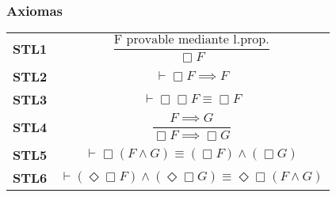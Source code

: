 \subsubsection{Axiomas}
\begin{tabular}{ll}
    \textbf{STL1} & 
    \begin{minipage}{0.5\linewidth}
    \begin{equation*}
        \frac{\text{F provable mediante l.prop.}}{\Box F}
    \end{equation*}
    \end{minipage} \\[10pt]
    \textbf{STL2} & 
    \begin{minipage}{0.5\linewidth}
    \begin{equation*}
        \vdash \Box F \implies F
    \end{equation*}
    \end{minipage} \\[10pt]
    \textbf{STL3} & 
    \begin{minipage}{0.5\linewidth}
    \begin{equation*}
        \vdash \Box\Box F \equiv \Box F
    \end{equation*}
    \end{minipage} \\[10pt]
    \textbf{STL4} & 
    \begin{minipage}{0.5\linewidth}
    \begin{equation*}
        \frac{F \implies G}{\Box F \implies \Box G}
    \end{equation*}
    \end{minipage} \\[15pt]
    \textbf{STL5} & 
    \begin{minipage}{0.5\linewidth}
    \begin{equation*}
        \vdash \Box(F \land G) \equiv (\Box F) \land (\Box G)
    \end{equation*}
    \end{minipage} \\[5pt]
    \textbf{STL6} & 
    \begin{minipage}{0.5\linewidth}
    \begin{equation*}
        \vdash (\Diamond\Box F) \land (\Diamond\Box G) \equiv \Diamond\Box(F \land G)
    \end{equation*}
    \end{minipage}
\end{tabular}

\vspace{0.5cm}

